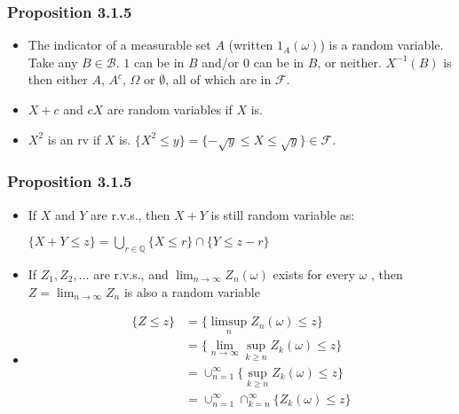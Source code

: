 \documentclass[handout]{beamer}
\begin{document}
\frame
{
  \frametitle{Proposition 3.1.5}

   \begin{itemize}

\item<1->  The indicator of a measurable set $A$ (written $1_A(\omega)$) is a random variable. Take any $B \in \mathcal{B}$. $1$ can be in $B$ and/or $0$ can be in $B$, or neither. $X^{-1}(B)$ is then either $A$, $A^c$, $\Omega$ or $\emptyset$, all of which are in $\mathcal{F}$.  

\item<2-> $X+c$ and $cX$ are random variables if $X$ is.

\item<3-> $X^2$ is an rv if $X$ is. $\{X^2 \le y\} = \{ - \sqrt{y} \le X \le \sqrt{y} \} \in \mathcal{F}$.
                                        
                 \end{itemize}
}

\frame
{
  \frametitle{Proposition 3.1.5}

   \begin{itemize}

    \item<1->  If $X$ and $Y$ are r.v.s., then $X+Y$ is still random variable as:
              
                  $\{X+Y\leq z\}=\bigcup_{r \in \mathbb{Q}} \{X\leq r\} \cap \{Y\leq z-r\} $
                 
    \item<3->  If $Z_1, Z_2, \ldots$ are r.v.s., and $\lim_{n\rightarrow \infty} Z_n(\omega)$ exists for every $\omega$ , then $Z=\lim_{n\rightarrow \infty} Z_n$ is also a random variable
                                  
\item<3->[-]  
\begin{align*}
\{Z\leq z\} &= \{ \limsup_{n} Z_n(\omega) \leq z\} \\
&= \{ \lim_{n\to\infty} \sup_{k \ge n} Z_k(\omega) \leq z\} \\
&= \cup_{n =1}^{\infty} \{  \sup_{k \ge n} Z_k(\omega) \leq z\} \\
&= \cup_{n =1}^{\infty} \cap_{k=n}^{\infty} \{  Z_k(\omega) \leq z\}
\end{align*}

%                   

\end{itemize}
}
\end{document}
